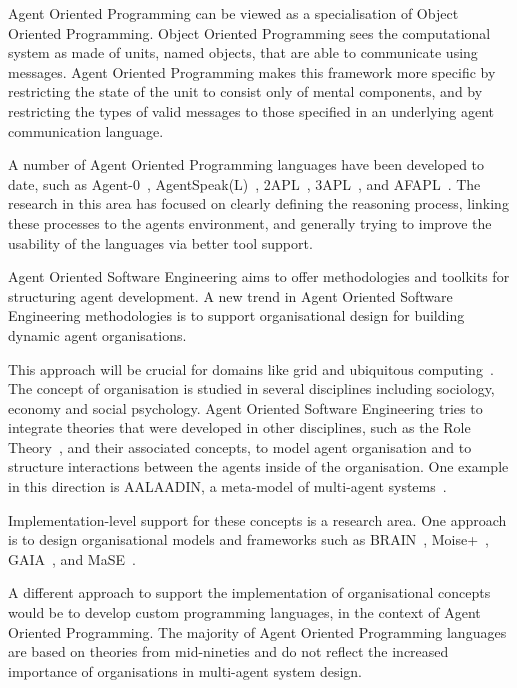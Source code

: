 \documentclass[a4paper,12pt,oneside,fleqn]{book} %
\begin{document}
Agent Oriented Programming can be viewed as a specialisation of Object
Oriented Programming\null. Object Oriented Programming sees the
computational system as made of units, named objects, that are able to
communicate using messages. Agent Oriented Programming makes this framework
more specific by restricting the state of the unit to consist only of
mental components, and by restricting the types of valid messages to those
specified in an underlying agent communication language.

A number of Agent Oriented Programming languages have been developed to
date, such as Agent-0~\cite{DBLP:journals/ai/Shoham93},
AgentSpeak(L)~\cite{DBLP:conf/maamaw/Rao96},
2APL~\cite{DBLP:journals/aamas/Dastani08},
3APL~\cite{DBLP:conf/promas/DastaniRDM03}, and
AFAPL~\cite{DBLP:conf/seke/CollierOR04}. The research in this area has
focused on clearly defining the reasoning process, linking these processes
to the agents environment, and generally trying to improve the usability of
the languages via better tool support.

Agent Oriented Software Engineering aims to offer methodologies and
toolkits for structuring agent development. A new trend in Agent Oriented
Software Engineering methodologies is to support organisational design for
building dynamic agent organisations.

This approach will be crucial for domains like grid and ubiquitous
computing~\cite{luck2005agent}. The concept of organisation is studied in
several disciplines including sociology, economy and social psychology.
Agent Oriented Software Engineering tries to integrate theories that were
developed in other disciplines, such as the Role
Theory~\cite{biddle1986recent}, and their associated concepts, to model
agent organisation and to structure interactions between the agents inside
of the organisation. One example in this direction is AALAADIN, a
meta-model of multi-agent systems~\cite{ferber1998meta}.

Implementation-level support for these concepts is a research area. One
approach is to design organisational models and frameworks such as
BRAIN~\cite{DBLP:conf/coopis/CabriLZ03},
Moise+~\cite{DBLP:conf/atal/HubnerSB02},
GAIA~\cite{DBLP:journals/aamas/WooldridgeJK00}, and
MaSE~\cite{deloach2001analysis}.

A different approach to support the implementation of organisational
concepts would be to develop custom programming languages, in the context
of Agent Oriented Programming. The majority of Agent Oriented Programming
languages are based on theories from mid-nineties and do not reflect the
increased importance of organisations in multi-agent system design.
\end{document}
